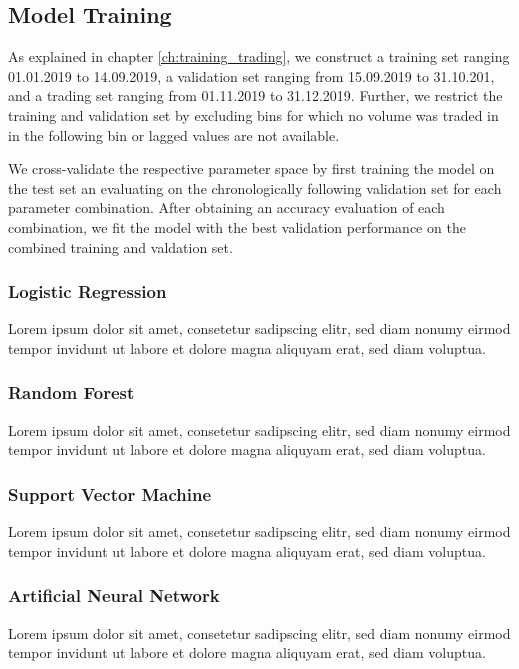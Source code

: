 \subsection{Model Training}
As explained in chapter \ref{ch:training_trading}, we construct a training set ranging 01.01.2019 to 14.09.2019, 
a validation set ranging from 15.09.2019 to 31.10.201, and a trading set ranging from 01.11.2019 to 31.12.2019.
Further, we restrict the training and validation set by excluding bins for which no volume 
was traded in in the following bin or lagged values are not available.


We cross-validate the respective parameter space by first training the model
on the test set an evaluating on the chronologically following validation set for each parameter combination.
After obtaining an accuracy evaluation of each combination, we fit the model with the best validation performance on
the combined training and valdation set.

\subsubsection{Logistic Regression}
Lorem ipsum dolor sit amet, consetetur sadipscing elitr, sed diam nonumy eirmod tempor invidunt ut labore et dolore magna aliquyam erat, sed diam voluptua.

\subsubsection{Random Forest}
Lorem ipsum dolor sit amet, consetetur sadipscing elitr, sed diam nonumy eirmod tempor invidunt ut labore et dolore magna aliquyam erat, sed diam voluptua.

\subsubsection{Support Vector Machine}
Lorem ipsum dolor sit amet, consetetur sadipscing elitr, sed diam nonumy eirmod tempor invidunt ut labore et dolore magna aliquyam erat, sed diam voluptua.

\subsubsection{Artificial Neural Network}
Lorem ipsum dolor sit amet, consetetur sadipscing elitr, sed diam nonumy eirmod tempor invidunt ut labore et dolore magna aliquyam erat, sed diam voluptua.


